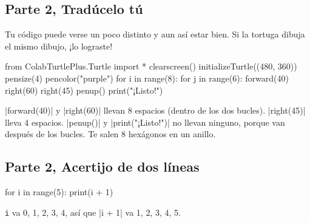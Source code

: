\subsection*{Parte 2, Tradúcelo tú}
Tu código puede verse un poco distinto y aun así estar bien. Si la tortuga dibuja el mismo dibujo, ¡lo lograste!
\begin{codenonum}
from ColabTurtlePlus.Turtle import *
clearscreen()
initializeTurtle((480, 360))
pensize(4)
pencolor("purple")
for i in range(8):
    for j in range(6):
        forward(40)
        right(60)
    right(45)
penup()
print("¡Listo!")
\end{codenonum}
\py|forward(40)| y \py|right(60)| llevan 8 espacios (dentro de los dos bucles). \py|right(45)| lleva 4 espacios. \py|penup()| y \py|print("¡Listo!")| no llevan ninguno, porque van después de los bucles. Te salen 8 hexágonos en un anillo.

\subsection*{Parte 2, Acertijo de dos líneas}
\begin{codenonum}
for i in range(5):
    print(i + 1)
\end{codenonum}
\texttt{i} va 0, 1, 2, 3, 4, así que \py|i + 1| va 1, 2, 3, 4, 5.
